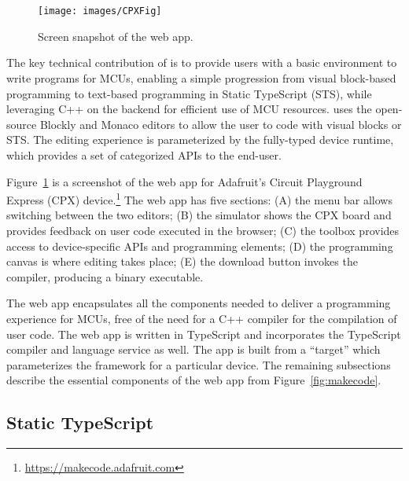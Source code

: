 \section{\MC}
\label{sec:makecode}

\begin{figure}[t]
    \texttt{[image: images/CPXFig]}
\caption{\label{fig:screenSnap}Screen snapshot of the \MC web app.}
\end{figure}

The key technical contribution of \MC is to provide users with a basic environment to write programs for MCUs, enabling a simple progression from visual block-based programming to text-based programming in Static TypeScript (STS), while leveraging C++ on the backend for efficient use of MCU resources. 
\MC uses the open-source Blockly and Monaco editors to allow the user to code with visual blocks or STS. The editing experience is parameterized by the fully-typed device runtime, 
which provides a set of categorized APIs to the end-user.


Figure~\ref{fig:screenSnap} is a screenshot of the \MC web app for Adafruit's Circuit Playground Express (CPX) device.\footnote{\url{https://makecode.adafruit.com}} The web app has five sections: (A) the menu bar allows switching between the two editors; (B) the simulator shows the CPX board and provides feedback on user code executed in the browser; (C) the toolbox provides access to device-specific APIs and programming elements; (D) the programming canvas is where
editing takes place; (E) the download button invokes the compiler, producing a binary executable.

The web app encapsulates all the components needed to deliver a programming experience for MCUs, free of the need for a C++ compiler for the compilation of user code. The web app is written in TypeScript and incorporates the TypeScript compiler and language service as well. The app is built from a \MC ``target'' which parameterizes the \MC framework for a particular device. The remaining subsections describe the essential components of the web app from Figure~\ref{fig:makecode}.

\subsection{Static TypeScript}

